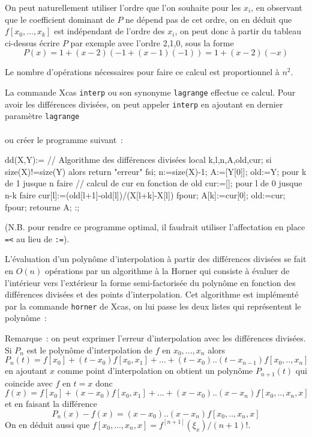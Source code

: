 \documentclass[a4paper,11pt]{article}
\begin{document}
\begin{giacjshere}
On peut naturellement utiliser l'ordre que l'on souhaite pour les
$x_i$, en observant que le coefficient dominant de $P$ ne d\'epend pas de
cet ordre, on en d\'eduit que $f[x_0,...,x_k]$ est ind\'ependant de
l'ordre des $x_i$, on peut donc \`a partir du tableau ci-dessus
\'ecrire $P$ par exemple avec l'ordre 2,1,0, sous la forme
\[ P(x)=1+(x-2)(-1+(x-1)(-1))=1+(x-2)(-x)\]

Le nombre d'op\'erations n\'ecessaires pour faire ce calcul est
proportionnel \`a $n^2$.

La commande Xcas \verb|interp| ou son synonyme \verb|lagrange|
effectue ce calcul. Pour avoir les diff\'erences divis\'ees, 
on peut appeler \verb|interp| en ajoutant en dernier
param\`etre \verb|lagrange| \\
\\
ou cr\'eer le programme suivant~:
\begin{giacprog}
dd(X,Y):={ // Algorithme des différences divisées
  local k,l,n,A,old,cur;
  si size(X)!=size(Y) alors return "erreur" fsi;
  n:=size(X)-1;
  A:=[Y[0]];
  old:=Y;
  pour k de 1 jusque n faire
    // calcul de cur en fonction de old
    cur:=[];
    pour l de 0 jusque n-k faire
      cur[l]:=(old[l+1]-old[l])/(X[l+k]-X[l])
    fpour;
    A[k]:=cur[0];
    old:=cur;
  fpour;
  retourne A;
}:;
\end{giacprog}
(N.B. pour rendre ce programme optimal, il faudrait utiliser
l'affectation en place \verb|=<| au lieu de \verb|:=|).

L'\'evaluation d'un polyn\^ome d'interpolation \`a partir des diff\'erences
divis\'ees se fait en $O(n)$ op\'erations
par un algorithme \`a la Horner qui consiste \`a \'evaluer
de l'int\'erieur vers l'ext\'erieur la forme semi-factoris\'ee
du polyn\^ome en fonction des diff\'erences divis\'ees et
des points d'interpolation. Cet algorithme est impl\'ement\'e
par la commande \verb|horner| 
de Xcas, on lui passe les deux listes 
qui repr\'esentent le polyn\^ome~:\\

Remarque~: on peut exprimer l'erreur d'interpolation
avec les diff\'erences divis\'ees. Si $P_n$ est le polyn\^ome
d'interpolation de $f$ en $x_0,...,x_n$ alors
$$ P_n(t)=f[x_0]+ (t-x_0)f[x_0,x_1]+...+(t-x_0)..(t-x_{n-1})f[x_0,..,x_n]$$
en ajoutant $x$ comme point d'interpolation on obtient un polyn\^ome
$P_{n+1}(t)$ qui coincide avec $f$ en $t=x$ donc
\begin{equation} \label{eq:fdd}
 f(x)=f[x_0]+ (x-x_0)f[x_0,x_1]+...+(x-x_0)..(x-x_{n})f[x_0,..,x_n,x]
\end{equation}
et en faisant la diff\'erence
\begin{equation} \label{eq:errinterpdd}
P_n(x)-f(x)=(x-x_0)..(x-x_{n})f[x_0,..,x_n,x]
\end{equation}
On en d\'eduit aussi que $f[x_0,...,x_n,x]=f^{[n+1]}(\xi_x)/(n+1)!$.


\end{giacjshere}
\end{document}
